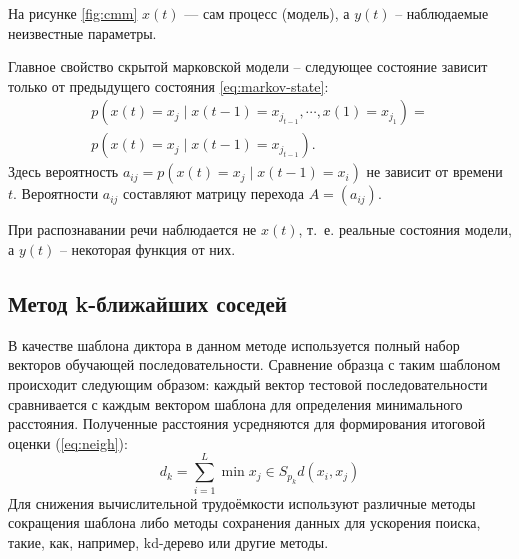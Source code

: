 На рисунке \ref{fig:cmm} $x(t)$ — сам процесс (модель), а $y(t)$ -- наблюдаемые неизвестные параметры.

Главное свойство скрытой марковской модели -- следующее состояние зависит только от предыдущего состояния \ref{eq:markov-state}:
\begin{multline}\label{eq:markov-state}
	p(x(t) = x_j \;| \; x(t - 1) = x_{j_{t - 1}}, \cdots, x(1) = x_{j_1}) = \\ 
					p(x(t) = x_{j}\;|\;x(t - 1) = x_{j_{t - 1}}). \;\;\;
\end{multline}
Здесь вероятность $a_{ij} = p(x(t) = x_j \;| \; x(t - 1) = x_{i})$ не зависит от времени $t$.
Вероятности $a_{ij}$ составляют матрицу перехода $A = (a_{ij})$.


При распознавании речи наблюдается не $x(t)$, т.~е. реальные состояния модели, а $y(t)$ -- некоторая функция от них.

%
%

\subsection{Метод k-ближайших соседей }
В качестве шаблона диктора в данном методе используется полный набор векторов обучающей последовательности. Сравнение образца с таким шаблоном происходит следующим образом: каждый вектор тестовой последовательности сравнивается с каждым вектором шаблона для определения минимального расстояния. Полученные расстояния усредняются для формирования итоговой оценки (\ref{eq:neigh}):
\begin{equation}\label{eq:neigh}
    d_k = \sum^{L}_{i = 1}\min{x_j\in S_{p_k}}d(x_i, x_j)
\end{equation}
Для снижения вычислительной трудоёмкости используют различные методы сокращения шаблона либо методы сохранения данных для ускорения поиска, такие, как, например, kd-дерево или другие методы. \cite{det}

